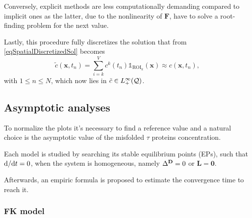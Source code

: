 \documentclass{article}
\begin{document}
                Conversely, explicit methods are less computationally demanding compared to implicit ones as the latter, due to the nonlinearity of $\mathbf F$, have to solve a root-finding problem for the next value. \cite{MACNMonegato2008,NMFEDormand2018}

                Lastly, this procedure fully discretizes the solution that from \eqref{eqSpatialDiscretizedSol} becomes
                \begin{equation}
                    \tilde c(\mathbf x,t_n)=
                    \sum_{i=k}^Vc^k(t_n)\mathbb1_{\text{ROI}_k}(\mathbf x)\approx
                    c(\mathbf x,t_n),
                    \label{eqTimeDiscretizedSol}
                \end{equation}
                with $1\le n\le N$, which now lies in $\tilde c\in L_+^\infty(\mathcal Q)$.

        \subsection{Asymptotic analyses}\label{secAsymptoticAnalyses}

            To normalize the plots it's necessary to find a reference value and a natural choice is the asymptotic value of the misfolded $\tau$ proteins concentration.

            Each model is studied by searching its stable equilibrium points (EPs), \ie{} such that $\mathrm{d}/\mathrm{d}t=0$, when the system is homogeneous, namely $\Delta^{\mathbf D}=0$ or $\mathbf L=\boldsymbol0$.

            Afterwards, an empiric formula is proposed to estimate the convergence time to reach it.

            \subsubsection{FK model}\label{secAsymptoticAnalysisFK}
\end{document}
